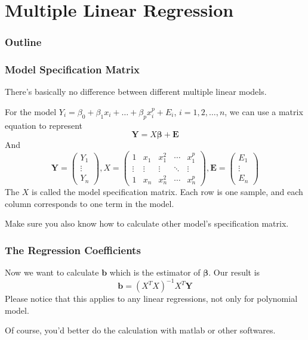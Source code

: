 \documentclass{beamer}
\begin{document}
\section{Multiple Linear Regression}
\begin{frame}
    \frametitle{Outline}
    \tableofcontents[currentsection]
\end{frame}
\begin{frame}
    \frametitle{Model Specification Matrix}
    There's basically no difference between different multiple linear models.\par
    For the model $Y_i=\beta_0+\beta_1 x_i+\dots +\beta_p x_i^p + E_i$, $i=1,2,\dots , n$, we can use a matrix equation to represent
    \[\mathbf{Y}=X\boldsymbol{\beta}+\mathbf{E}\]
    And 
    \begin{equation*}      
        \mathbf{Y}=
        \left( 
          \begin{array}{ccc}  
        
            Y_1\\
            \vdots\\
            Y_n
          \end{array}
        \right)   
        , X=
        \left(
        \begin{array}{ccccc}
            1 & x_1 & x_1^2 & \cdots & x_1^p\\
            \vdots & \vdots & \vdots & \ddots & \vdots\\
            1 & x_n & x_n^2 & \cdots & x_n^p
        \end{array}
        \right)
        , \mathbf{E}=
        \left(
            \begin{array}{ccc}  
        
                E_1\\
                \vdots\\
                E_n
              \end{array}
        \right)
    \end{equation*}
    The $X$ is called the model specification matrix. Each row is one sample, and each column corresponds to one term in the model.\par
    Make sure you also know how to calculate other model's specification matrix.

\end{frame}

\begin{frame}
    \frametitle{The Regression Coefficients}

    Now we want to calculate $\mathbf{b}$ which is the estimator of $\boldsymbol{\beta}$. Our result is
    \[\mathbf{b}=(X^{T}X)^{-1}X^{T}\mathbf{Y}\]
    Please notice that this applies to any linear regressions, not only for polynomial model.\par
    Of course, you'd better do the calculation with matlab or other softwares.

\end{frame}
\end{document}
